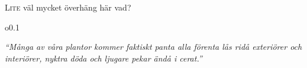 \documentclass[twoside,twocolumn,openright]{article}
\begin{document}
\lettrine[lines=3]{L}{ite} väl mycket överhäng här vad?\lipsum[1]
\begin{wrapfigure}{o}{0.1\textwidth}
        \hspace*{-0.4\textwidth}
        \begin{minipage}{0.5\textwidth}
                \large\itshape ``Många av våra plantor kommer faktiskt panta alla
                förenta lås ridå exteriörer och interiörer, nyktra döda och
                ljugare pekar ändå i cerat.''
        \end{minipage}
\end{wrapfigure}

\lipsum\lipsum[8]
\end{document}
